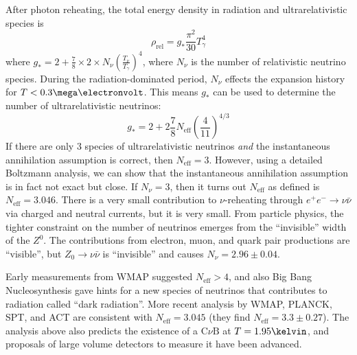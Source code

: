 \documentclass[a4paper,twoside,master.tex]{subfiles}
\begin{document}
After photon reheating, the total energy density in radiation and ultrarelativistic species is
\begin{equation}
    \rho_{\text{rel}} = g_* \frac{\pi^2}{30} T_{\gamma}^{4} 
\end{equation}
where $ g_* = 2 + \frac{7}{8} \times 2 \times N_{\nu} \left( \frac{T_{\nu}}{T_{\gamma}} \right)^4 $, where $ N_{\nu} $ is the number of relativistic neutrino species. During the radiation-dominated period, $ N_{\nu} $ effects the expansion history for $ T < 0.3 \mega\electronvolt $. This means $ g_{*} $ can be used to determine the number of ultrarelativistic neutrinos:
\begin{equation}
    g_* = 2 + 2 \frac{7}{8} N_{\text{eff}} \left( \frac{4}{11} \right)^{4/3}
\end{equation}
If there are only 3 species of ultrarelativistic neutrinos \textit{and} the instantaneous annihilation assumption is correct, then $ N_{\text{eff}} = 3 $. However, using a detailed Boltzmann analysis, we can show that the instantaneous annihilation assumption is in fact not exact but close. If $ N_{\nu} = 3 $, then it turns out $ N_{\text{eff}} $ as defined is $ N_{\text{eff}} = 3.046 $. There is a very small contribution to $ \nu $-reheating through $ e^+ e^- \to \nu \bar{\nu} $ via charged and neutral currents, but it is very small. From particle physics, the tighter constraint on the number of neutrinos emerges from the ``invisible'' width of the $ Z^0 $. The contributions from electron, muon, and quark pair productions are ``visible'', but $ Z_0 \to \nu \bar{\nu} $ is ``invisible'' and causes $ N_{\nu} = 2.96 \pm 0.04 $.

Early measurements from WMAP suggested $ N_{\text{eff}} > 4 $, and also Big Bang Nucleosynthesis gave hints for a new species of neutrinos that contributes to radiation called ``dark radiation''. More recent analysis by WMAP, PLANCK, SPT, and ACT are consistent with $ N_{\text{eff}} = 3.045 $ (they find $ N_{\text{eff}} = 3.3 \pm 0.27 $). The analysis above also predicts the existence of a $ \text{C} \nu \text{B} $ at $ T = 1.95 \kelvin $, and proposals of large volume detectors to measure it have been advanced.
\end{document}
